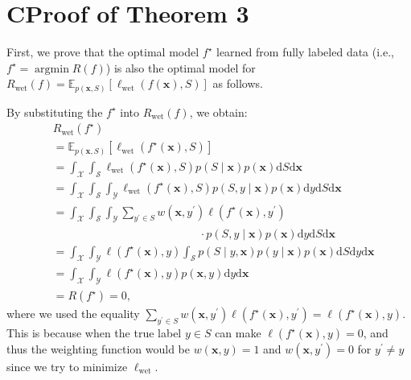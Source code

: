 \documentclass[letterpaper]{article} %
\newcommand{\argmin}{\mathop{\arg\min}}
\begin{document}
\section{C\quad Proof of Theorem 3}
First, we prove that the optimal model $f^\star$ learned from fully labeled data (i.e., $f^\star = \argmin R(f)$) is also the optimal model for $R_{\mathrm{wet}}(f)=\mathbb{E}_{p(\bm{x},S)}[\ell_{\mathrm{wet}}(f(\bm{x}),S)]$ as follows. 

By substituting the $f^\star$ into $R_{\mathrm{wet}}(f)$, we obtain:
\begin{align}
\nonumber
&R_{\mathrm{wet}}(f^\star) \\
\nonumber
&=\mathbb{E}_{p(\bm{x}, S)}[\ell_{\mathrm{wet}}(f^\star(\bm{x}),S)]\\
\nonumber
&=\int_{\mathcal{X}}\int_{\mathcal{S}}\ell_{\mathrm{wet}}(f^\star(\bm{x}),S)p(S\mid\bm{x})p(\bm{x})\mathrm{d}S \mathrm{d}\bm{x}\\
\nonumber
&=\int_{\mathcal{X}}\int_{\mathcal{S}}\int_{\mathcal{Y}}\ell_{\mathrm{wet}}(f^\star(\bm{x}),S)p(S,y\mid\bm{x})p(\bm{x})\mathrm{d}y \mathrm{d}S \mathrm{d}\bm{x}\\
\nonumber
&=\int_{\mathcal{X}}\int_{\mathcal{S}}\int_{\mathcal{Y}}\sum\nolimits_{y^\prime\in S}w(\bm{x},y^\prime)\ell(f^\star(\bm{x}), y^\prime)\\
\nonumber
&\qquad\qquad\qquad\qquad\qquad\qquad\quad\cdot p(S,y\mid\bm{x})p(\bm{x})\mathrm{d}y \mathrm{d}S \mathrm{d}\bm{x}\\
\nonumber
\nonumber
&=\int_{\mathcal{X}}\int_{\mathcal{Y}}\ell(f^\star(\bm{x}), y)\int_{\mathcal{S}}p(S\mid y,\bm{x})p(y\mid\bm{x})p(\bm{x})\mathrm{d}S \mathrm{d}y \mathrm{d}\bm{x}\\
\nonumber
&=\int_{\mathcal{X}}\int_{\mathcal{Y}}\ell(f^\star(\bm{x}), y)p(\bm{x},y)\mathrm{d}y \mathrm{d}\bm{x}\\
\nonumber
&=R(f^\star)=0,
\end{align}
where we used the equality $\sum\nolimits_{y^\prime\in S}w(\bm{x},y^\prime)\ell(f^\star(\bm{x}), y^\prime)=\ell(f^\star(\bm{x}),y)$. This is because when the true label $y\in S$ can make $\ell(f^\star(\bm{x}),y)=0$, and thus the weighting function would be $w(\bm{x},y)=1$ and $w(\bm{x},y^\prime)=0$ for $y^\prime\neq y$ since we try to minimize $\ell_{\mathrm{wet}}$.
\end{document}

